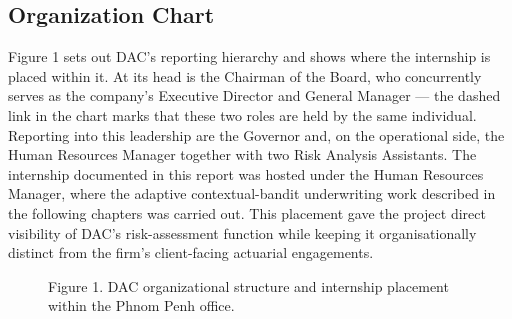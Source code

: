 \subsection{Organization Chart}\label{organization-chart}

Figure 1 sets out DAC's reporting hierarchy and shows where the internship is placed within it. At its head is the Chairman of the Board, who concurrently serves as the company's Executive Director and General Manager --- the dashed link in the chart marks that these two roles are held by the same individual. Reporting into this leadership are the Governor and, on the operational side, the Human Resources Manager together with two Risk Analysis Assistants. The internship documented in this report was hosted under the Human Resources Manager, where the adaptive contextual-bandit underwriting work described in the following chapters was carried out. This placement gave the project direct visibility of DAC's risk-assessment function while keeping it organisationally distinct from the firm's client-facing actuarial engagements.

\begin{figure}[H]
    \centering
    \caption[Figure 1. DAC organizational structure and internship placement]{Figure 1. DAC organizational structure and internship placement within the Phnom Penh office.}
    \label{fig:organization_chart}
\end{figure}

